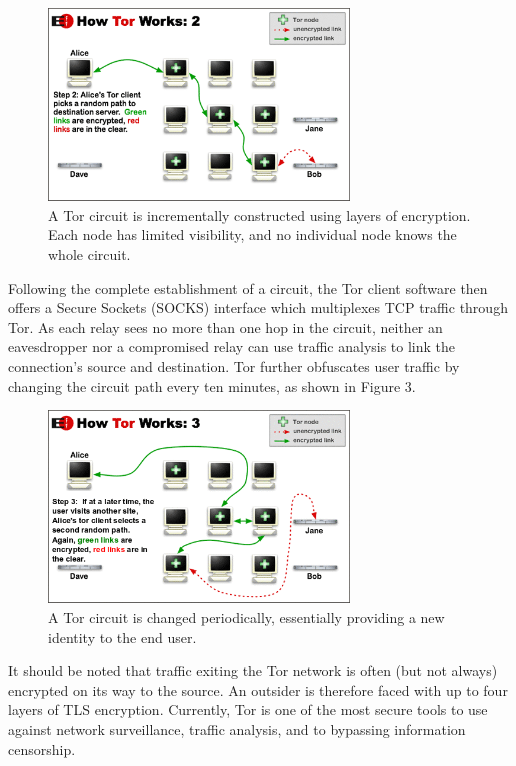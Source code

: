 \documentclass[journal]{IEEEtran}
\begin{document}
\begin{figure}[htbp]
\centering
\begin{minipage}{8 cm}
    \includegraphics[width=80mm]{resources/circuit-building-2.png}
    \caption{A Tor circuit is incrementally constructed using layers of encryption. Each node has limited visibility, and no individual node knows the whole circuit.\cite{TorOverview}}
\end{minipage}
\end{figure}

Following the complete establishment of a circuit, the Tor client software then offers a Secure Sockets (SOCKS) interface which multiplexes TCP traffic through Tor. As each relay sees no more than one hop in the circuit, neither an eavesdropper nor a compromised relay can use traffic analysis to link the connection's source and destination. Tor further obfuscates user traffic by changing the circuit path every ten minutes,\cite{McCoy2008} as shown in Figure 3.

\begin{figure}[htbp]
\centering
\begin{minipage}{8 cm}
  \includegraphics[width=80mm]{resources/circuit-building-3.png}
  \caption{A Tor circuit is changed periodically, essentially providing a new identity to the end user.\cite{TorOverview}}
\end{minipage}
\end{figure}

It should be noted that traffic exiting the Tor network is often (but not always) encrypted on its way to the source. An outsider is therefore faced with up to four layers of TLS encryption. Currently, Tor is one of the most secure tools to use against network surveillance, traffic analysis, and to bypassing information censorship.
\end{document}
